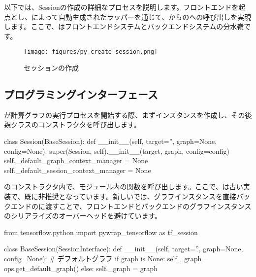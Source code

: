 \begin{content}

以下では、Sessionの作成の詳細なプロセスを説明します。フロントエンドを起点とし、によって自動生成されたラッパーを通じて、からのへの呼び出しを実現します。ここで、はフロントエンドシステムとバックエンドシステムの分水嶺です。

\begin{figure}[H]
\centering
\texttt{[image: figures/py-create-session.png]}
\caption{セッションの作成}
 \label{fig:py-create-session}
\end{figure}

\subsection{プログラミングインターフェース}

が計算グラフの実行プロセスを開始する際、まずインスタンスを作成し、その後親クラスのコンストラクタを呼び出します。

\begin{leftbar}
\begin{python}[caption={tensorflow/python/client/session.py}]
class Session(BaseSession):
  def __init__(self, target='', graph=None, config=None):
    super(Session, self).__init__(target, graph, config=config)
    self._default_graph_context_manager = None
    self._default_session_context_manager = None
\end{python}
\end{leftbar}

のコンストラクタ内で、モジュール内の関数を呼び出します。ここで、は古い実装で、既に非推奨となっています。新しいでは、グラフインスタンスを直接バックエンドのに渡すことで、フロントエンドとバックエンドのグラフインスタンスのシリアライズのオーバーヘッドを避けています。

\begin{leftbar}
\begin{python}[caption={tensorflow/python/client/session.py}]
from tensorflow.python import pywrap_tensorflow as tf_session

class BaseSession(SessionInterface):
  def __init__(self, target='', graph=None, config=None):
    # デフォルトグラフ
    if graph is None:
      self._graph = ops.get_default_graph()
    else:
      self._graph = graph


\end{python}
\end{leftbar}
\end{content}
